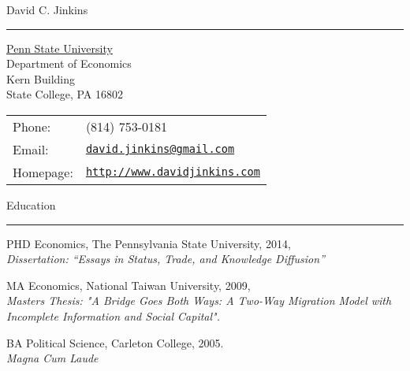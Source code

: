 \documentclass[letterpaper]{article}
\def\name{David C. Jinkins}
\renewenvironment{itemize}{
    \begin{list}{}{
            \setlength{\leftmargin}{1.5em}
            \setlength{\parskip}{0pt}
            \setlength{\parsep}{0pt}
        }
    }{
    \end{list}
}
\begin{document}
{\huge \name}
\hrule


\vspace{4mm}

\begin{minipage}{0.45\linewidth}
    \hspace*{5mm}\href{http://www.psu.edu/}{Penn State University} \\
    \hspace*{5mm}Department of Economics \\
    \hspace*{5mm}Kern Building \\
    \hspace*{5mm}State College, PA 16802
\end{minipage}
\begin{minipage}{0.45\linewidth}
    \begin{tabular}{ll}
        Phone: & (814) 753-0181 \\
        Email: & \href{mailto:david.jinkins@gmail.com}{\tt david.jinkins@gmail.com} \\
        Homepage: & \href{http://www.davidjinkins.com}{\tt http://www.davidjinkins.com} \\
    \end{tabular}
\end{minipage}

\vspace{7mm}
{\Large Education}
\vspace{1mm}
\hrule

\begin{itemize}
    \item PHD Economics, The Pennsylvania State University, 2014,\\
    	\hspace*{1cm}\emph{Dissertation: ``Essays in Status, Trade, and Knowledge Diffusion''}

    \item MA Economics, National Taiwan University, 2009,\\
        \hspace*{1cm}\emph{Masters Thesis: "A Bridge Goes Both Ways: A Two-Way Migration Model with Incomplete Information \hspace*{1cm}and Social Capital".}

    \item BA Political Science, Carleton College, 2005.\\
        \hspace*{1cm}\emph{Magna Cum Laude}
\end{itemize}
\end{document}
